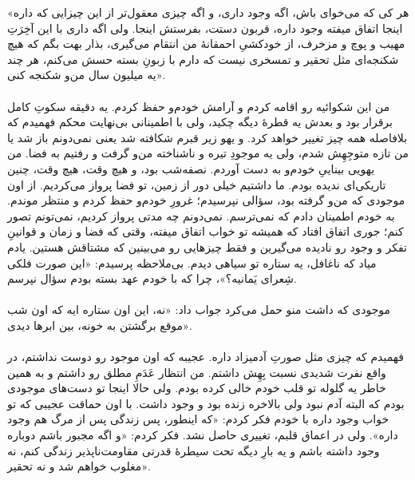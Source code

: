 \documentclass[12pt]{book}
\begin{document}
    «هر کی که می‌خوای باش، اگه وجود داری، و اگه چیزی معقول‌تر از این چیزایی که داره اینجا اتفاق میفته وجود داره، قربون دستت، بفرستش اینجا. ولی اگه داری با این آخِرَتِ مهیب و پوچ و مزخرف، از خودکشیِ احمقانهٔ من انتقام می‌گیری، بذار بهت بگم که هیچ شکنجه‌ای مثل تحقیر و تمسخری نیست که دارم با زبونِ بسته حسش می‌کنم، هر چند یه میلیون سال من‌و شکنجه کنی».

    \paragraph{}
    من این شکوائیه رو اقامه کردم و آرامش خودم‌و حفظ کردم. یه دقیقه سکوتِ کامل برقرار بود و بعدش یه قطرهٔ دیگه چکید، ولی با اطمینانی بی‌نهایت محکم فهمیدم که بلافاصله همه چیز تغییر خواهد کرد. و یهو زیر قبرم شکافته شد یعنی نمی‌دونم باز شد یا من تازه متوجِهِش شدم، ولی یه موجودِ تیره و ناشناخته من‌و گرفت و رفتیم به فضا. من یهویی بیناییِ خودم‌و به دست آوردم. نصفه‌شب بود، و هیچ وقت، هیچ وقت، چنین تاریکی‌ای ندیده بودم. ما داشتیم خیلی دور از زمین، تو فضا پرواز می‌کردیم. از اون موجودی که من‌و گرفته بود، سؤالی نپرسیدم؛ غرورِ خودم‌و حفظ کردم و منتظر موندم. به خودم اطمینان دادم که نمی‌ترسم. نمی‌دونم چه مدتی پرواز کردیم، نمی‌تونم تصور کنم؛ جوری اتفاق افتاد که همیشه تو خواب اتفاق میفته، وقتی که  فضا و زمان و قوانینِ تفکر و وجود رو نادیده می‌گیرین و فقط چیزهایی رو می‌بینین که مشتاقش هستین. یادم میاد که ناغافل، یه ستاره تو سیاهی دیدم. بی‌ملاحظه پرسیدم: «این صورت فلکی شِعرای یَمانیه؟»، چرا که با خودم عهد بسته بودم سؤال نپرسم.

    \paragraph{}
    موجودی که داشت منو حمل می‌کرد جواب داد: «نه، این اون ستاره ایه که اون شب موقع برگشتن به خونه، بین ابرها دیدی».

    \paragraph{}
    فهمیدم که چیزی مثل صورتِ آدمیزاد داره. عجیبه که اون موجود رو دوست نداشتم، در واقع نفرت شدیدی نسبت بِهِش داشتم. من انتظار عَدَمِ مطلق رو داشتم و به همین خاطر یه گلوله تو قلب خودم خالی کرده بودم. ولی حالا اینجا تو دست‌های موجودی بودم که البته آدم نبود ولی بالاخره زنده بود و وجود داشت. با اون حماقت عجیبی که تو خواب وجود داره با خودم فکر کردم: «که اینطور، پس زندگی پس از مرگ هم وجود داره». ولی در اعماق قلبم، تغییری حاصل نشد. فکر کردم: «و اگه مجبور باشم دوباره وجود داشته باشم و یه بارِ دیگه تحت سیطرهٔ قدرتی مقاومت‌ناپذیر زندگی کنم، نه مغلوب خواهم شد و نه تحقیر».
\end{document}

